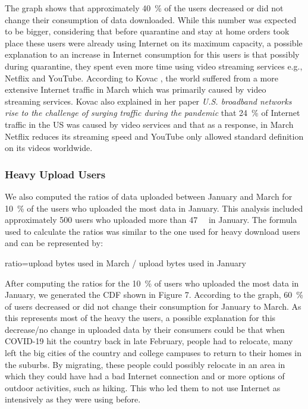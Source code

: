 \documentclass[conference]{IEEEtran}
\begin{document}
The graph shows that approximately \SI{40}{\percent} of the users decreased or did not change their consumption of data downloaded. While this number was expected to be bigger, considering that before quarantine and stay at home orders took place these users were already using  Internet on its maximum capacity, a possible explanation to an increase in Internet consumption for this users is that possibly during quarantine, they spent even more time using video streaming services e.g., Netflix and YouTube. According to Kovac \cite{kovacs}, the world suffered from a more extensive Internet traffic in March which was primarily caused by video streaming services. Kovac also explained in her paper \textit{U.S. broadband networks rise to the challenge of surging traffic during the pandemic} that \SI{24}{\percent} of  Internet traffic in the US was caused by video services and that as a response, in March Netflix reduces its streaming speed and YouTube only allowed standard definition on its videos worldwide.  

\subsubsection{Heavy Upload Users}
\label{sec:heavy-upload-users}

We also computed the ratios of data uploaded between January and March for \SI{10}{\percent} of the users who uploaded the most data in January. This analysis included approximately 500 users who uploaded more than \SI{47}{\giga\byte} in January. The formula used to calculate the ratios was similar to the one used for heavy download users and can be represented by: 

ratio=upload bytes used in March / upload bytes used in January

After computing the ratios for the \SI{10}{\percent} of users who uploaded the most data in January, we generated the CDF shown in Figure 7. According to the graph, \SI{60}{\percent} of users decreased or did not change their consumption for January to March. As this represents most of the heavy the users, a possible explanation for this decrease/no change in uploaded data by their consumers could be that when COVID-19 hit the country back in late February, people had to relocate, many left the big cities of the country and college campuses to return to their homes in the suburbs. By migrating, these people could possibly relocate in an area in which they could have had a bad Internet connection and or more options of outdoor activities, such as hiking. This who led them to not use  Internet as intensively as they were using before.
\end{document}
